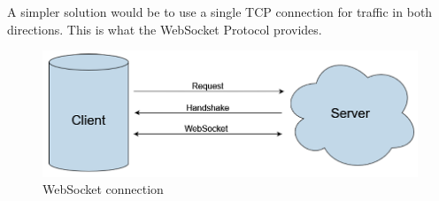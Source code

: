 	A simpler solution would be to use a single TCP connection for
	traffic in both directions.  This is what the WebSocket Protocol
	provides.

	\begin{figure}[h!]
		\includegraphics{include/imgs/websocket.PNG}
		\caption{WebSocket connection}
	\end{figure}

